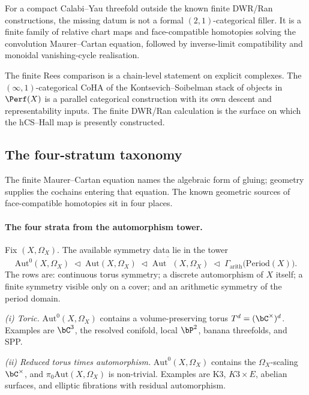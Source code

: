 \begin{remark}
\label{rem:finite-comparison-failure}
For a compact Calabi--Yau threefold outside the known finite
DWR/Ran constructions, the missing datum is not a formal
$(2,1)$-categorical filler. It is a finite family of relative
chart maps and face-compatible homotopies solving the convolution
Maurer--Cartan equation, followed by inverse-limit compatibility and
monoidal vanishing-cycle realisation.
\end{remark}

\begin{remark}
\label{rem:cat-viewpoint-coha}
The finite Rees comparison is a chain-level statement on explicit
complexes. The $(\infty,1)$-categorical CoHA of the
Kontsevich--Soibelman stack of objects in $\Perf(X)$ is a parallel
categorical construction with its own descent and representability
inputs. The finite DWR/Ran calculation is the surface on which the
hCS--Hall map is presently constructed.
\end{remark}

\subsection{The four-stratum taxonomy}
\label{sec:four-stratum-taxonomy}

The finite Maurer--Cartan equation names the algebraic form of
gluing; geometry supplies the cochains entering that equation. The
known geometric sources of face-compatible homotopies sit in four
places.

\paragraph{The four strata from the automorphism tower.} Fix
$(X,\Omega_X)$. The available symmetry data lie in the tower
\[
 \mathrm{Aut}^{0}(X,\Omega_X)
 \;\lhd\;
 \mathrm{Aut}(X,\Omega_X)
 \;\lhd\;
 \mathrm{Aut}^{\widetilde{\phantom{X}}}(X,\Omega_X)
 \;\lhd\;
 \Gamma_{\mathrm{arith}}\bigl(\mathrm{Period}(X)\bigr).
\]
The rows are: continuous torus symmetry; a discrete automorphism of
$X$ itself; a finite symmetry visible only on a cover; and an
arithmetic symmetry of the period domain.

\emph{(i) Toric.} $\mathrm{Aut}^0(X,\Omega_X)$ contains a
volume-preserving torus $T^d=(\bC^\times)^d$. Examples are $\bC^3$,
the resolved conifold, local $\bP^2$, banana threefolds, and SPP.

\emph{(ii) Reduced torus times automorphism.}
$\mathrm{Aut}^0(X,\Omega_X)$ contains the $\Omega_X$-scaling
$\bC^\times$, and $\pi_0\mathrm{Aut}(X,\Omega_X)$ is non-trivial.
Examples are K3, $K3\times E$, abelian surfaces, and elliptic
fibrations with residual automorphism.

